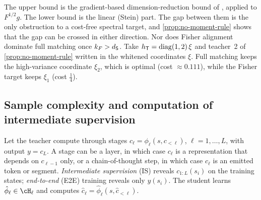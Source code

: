 \noindent
The upper bound is the gradient-based dimension-reduction bound of \citet{zahm2020gradient}, applied to $F^{1/2}g$. The
lower bound is the linear (Stein) part. The gap between them is the only obstruction to a cost-free spectral target,
and \cref{prop:no-moment-rule} shows that the gap can be crossed in either direction. Nor does Fisher alignment
dominate full matching once $k_F>d_{\mathsf{S}}$. Take $h_{\mathsf{T}}=\operatorname{diag}(1,2)\,\xi$ and teacher~2 of \cref{prop:no-moment-rule} written in
the whitened coordinates $\xi$. Full matching keeps the high-variance coordinate $\xi_2$, which is optimal (cost $\approx0.111$),
while the Fisher target keeps $\xi_1$ (cost $\frac14$).

\subsection{Sample complexity and computation of intermediate supervision}\label{sec:repr-complexity}

Let the teacher compute through stages $c_\ell=\phi_\ell(s,c_{<\ell})$, $\ell=1,\dots,L$, with output $y=c_L$. A stage can be a
layer, in which case $c_\ell$ is a representation that depends on $c_{\ell-1}$ only, or a chain-of-thought step, in which
case $c_\ell$ is an emitted token or segment. \emph{Intermediate supervision} (IS) reveals $c_{1:L}(s_i)$ on the training
states; \emph{end-to-end} (E2E) training reveals only $y(s_i)$. The student learns $\hat\phi_\ell\in\cH_\ell$ and computes
$\hat c_\ell=\hat\phi_\ell(s,\hat c_{<\ell})$.

